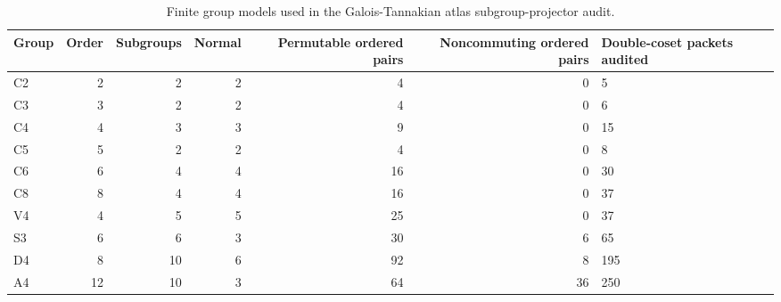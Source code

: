 \begin{table}[htbp]
\centering
\caption{Finite group models used in the Galois-Tannakian atlas subgroup-projector audit.}
\label{tab:block12-groups}
\scriptsize
\begin{tabularx}{\textwidth}{@{}L{0.12\textwidth}rrrrrY@{}}
\toprule
Group & Order & Subgroups & Normal & Permutable ordered pairs & Noncommuting ordered pairs & Double-coset packets audited\\
\midrule
C2 & 2 & 2 & 2 & 4 & 0 & 5\\
C3 & 3 & 2 & 2 & 4 & 0 & 6\\
C4 & 4 & 3 & 3 & 9 & 0 & 15\\
C5 & 5 & 2 & 2 & 4 & 0 & 8\\
C6 & 6 & 4 & 4 & 16 & 0 & 30\\
C8 & 8 & 4 & 4 & 16 & 0 & 37\\
V4 & 4 & 5 & 5 & 25 & 0 & 37\\
S3 & 6 & 6 & 3 & 30 & 6 & 65\\
D4 & 8 & 10 & 6 & 92 & 8 & 195\\
A4 & 12 & 10 & 3 & 64 & 36 & 250\\
\bottomrule
\end{tabularx}
\end{table}
